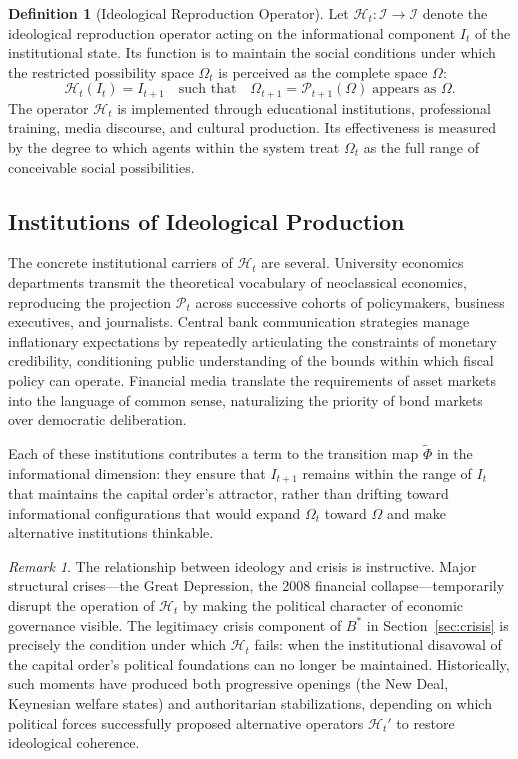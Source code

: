 \documentclass[12pt,a4paper]{article}
\theoremstyle{definition}
\newtheorem{definition}{Definition}[section]
\theoremstyle{remark}
\newtheorem{remark}{Remark}[section]
\begin{document}
\begin{definition}[Ideological Reproduction Operator]
Let $\mathcal{H}_t : \mathcal{I} \to \mathcal{I}$ denote the ideological reproduction operator acting on the informational component $I_t$ of the institutional state. Its function is to maintain the social conditions under which the restricted possibility space $\Omega_t$ is perceived as the complete space $\Omega$:
\begin{equation}
  \label{eq:hegemony}
  \mathcal{H}_t(I_t) = I_{t+1} \quad \text{such that} \quad
  \Omega_{t+1} = \mathcal{P}_{t+1}(\Omega) \;\text{appears as } \Omega.
\end{equation}
The operator $\mathcal{H}_t$ is implemented through educational institutions, professional training, media discourse, and cultural production. Its effectiveness is measured by the degree to which agents within the system treat $\Omega_t$ as the full range of conceivable social possibilities.
\end{definition}

\subsection{Institutions of Ideological Production}

The concrete institutional carriers of $\mathcal{H}_t$ are several. University economics departments transmit the theoretical vocabulary of neoclassical economics, reproducing the projection $\mathcal{P}_t$ across successive cohorts of policymakers, business executives, and journalists. Central bank communication strategies manage inflationary expectations by repeatedly articulating the constraints of monetary credibility, conditioning public understanding of the bounds within which fiscal policy can operate. Financial media translate the requirements of asset markets into the language of common sense, naturalizing the priority of bond markets over democratic deliberation.

Each of these institutions contributes a term to the transition map $\tilde\Phi$ in the informational dimension: they ensure that $I_{t+1}$ remains within the range of $I_t$ that maintains the capital order's attractor, rather than drifting toward informational configurations that would expand $\Omega_t$ toward $\Omega$ and make alternative institutions thinkable.

\begin{remark}
The relationship between ideology and crisis is instructive. Major structural crises---the Great Depression, the 2008 financial collapse---temporarily disrupt the operation of $\mathcal{H}_t$ by making the political character of economic governance visible. The legitimacy crisis component of $B^*$ in Section~\ref{sec:crisis} is precisely the condition under which $\mathcal{H}_t$ fails: when the institutional disavowal of the capital order's political foundations can no longer be maintained. Historically, such moments have produced both progressive openings (the New Deal, Keynesian welfare states) and authoritarian stabilizations, depending on which political forces successfully proposed alternative operators $\mathcal{H}_t'$ to restore ideological coherence.
\end{remark}
\end{document}
